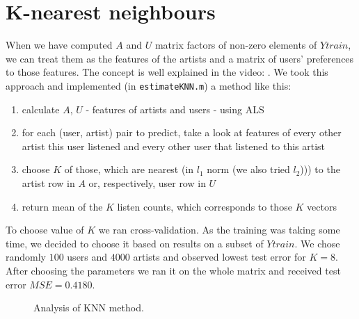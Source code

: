 \documentclass{report}
\begin{document}
\section{K-nearest neighbours}
When we have computed $A$ and $U$ matrix factors of non-zero elements of $Ytrain$, we can treat them as the features of the artists and a matrix of users' preferences to those features. The concept is well explained in the video: \cite{cfng}. We took this approach and implemented (in \texttt{estimateKNN.m}) a method like this:
\begin{enumerate}
\item calculate $A$, $U$ - features of artists and users - using ALS
\item for each (user, artist) pair to predict, take a look at features of every other artist this user listened and every other user that listened to this artist
\item choose $K$ of those, which are nearest (in $l_1$ norm (we also tried $l_2$))) to the artist row in $A$ or, respectively, user row in $U$
\item return mean of the $K$ listen counts, which corresponds to those $K$ vectors
\end{enumerate}

To choose value of $K$ we ran cross-validation. As the training was taking some time, we decided to choose it based on results on a subset of $Ytrain$. We chose randomly $100$ users and $4000$ artists and observed lowest test error for $K=8$. After choosing the parameters we ran it on the whole matrix and received test error $MSE=0.4180$.
\begin{figure}[!h]
\center
{}
\caption{Analysis of KNN method.}
\end{figure}
\end{document}
